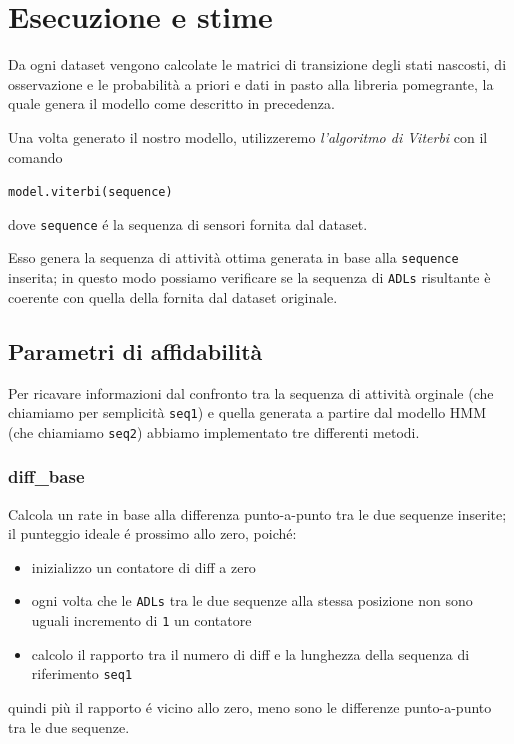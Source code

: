 \documentclass[12pt, a4paper]{scrartcl}
\begin{document}
\section*{Esecuzione e stime}
Da ogni dataset vengono calcolate le matrici di transizione degli stati nascosti, di osservazione e le probabilità a priori e dati in pasto alla libreria pomegrante, la quale genera il modello come descritto in precedenza.

Una volta generato il nostro modello, utilizzeremo \emph{l'algoritmo di Viterbi} con il comando 
\begin{center}\begin{addmargin}[2em]{2em}
\texttt{model.viterbi(sequence)}
\end{addmargin}\end{center}

dove \texttt{sequence} é la sequenza di sensori fornita dal dataset. 

Esso genera la sequenza di attività ottima generata in base alla \texttt{sequence} inserita; in questo modo possiamo verificare se la sequenza di \texttt{ADLs} risultante è coerente con quella della fornita dal dataset originale.

\subsection*{Parametri di affidabilità}
Per ricavare informazioni dal confronto tra la sequenza di attività orginale (che chiamiamo per semplicità \texttt{seq1}) e quella generata a partire dal modello HMM (che chiamiamo \texttt{seq2}) abbiamo implementato tre differenti metodi.

\subsubsection*{diff\_base}
Calcola un rate in base alla differenza punto-a-punto tra le due sequenze inserite; il punteggio ideale é prossimo allo zero, poiché:
\begin{itemize}
\item inizializzo un contatore di diff a zero
\item ogni volta che le \texttt{ADLs} tra le due sequenze alla stessa posizione non sono uguali incremento di \texttt{1} un contatore 
\item calcolo il rapporto tra il numero di diff e la lunghezza della sequenza di riferimento \texttt{seq1}
\end{itemize}
quindi più il rapporto é vicino allo zero, meno sono le differenze punto-a-punto tra le due sequenze.
\end{document}
